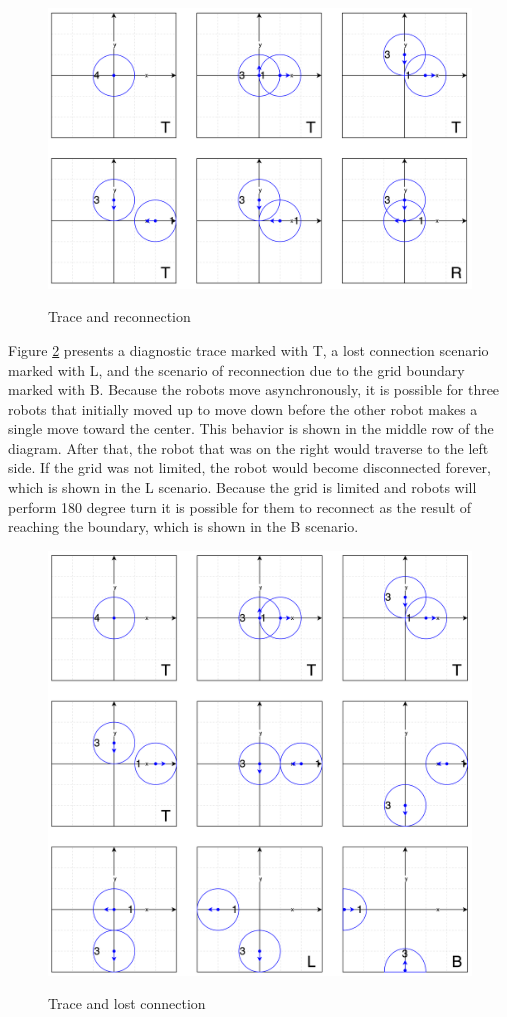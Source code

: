 \begin{figure}[H]
\caption{Trace and reconnection}
\includegraphics[width=\textwidth]{images/reconnection.png}
\label{fig:reconnection}
\end{figure}
\newpage
\noindent
Figure \ref{fig:lost_connection} presents a diagnostic trace marked with T, a lost connection scenario marked with L, and the scenario of reconnection due to the grid boundary marked with B. Because the robots move asynchronously, it is possible for three robots that initially moved up to move down before the other robot makes a single move toward the center. This behavior is shown in the middle row of the diagram. After that, the robot that was on the right would traverse to the left side. If the grid was not limited, the robot would become disconnected forever, which is shown in the L scenario. Because the grid is limited and robots will perform 180 degree turn it is possible for them to reconnect as the result of reaching the boundary, which is shown in the B scenario.

\begin{figure}[H]
\caption{Trace and lost connection}
\includegraphics[width=\textwidth]{images/lost_connection.png}
\label{fig:lost_connection}
\end{figure}


